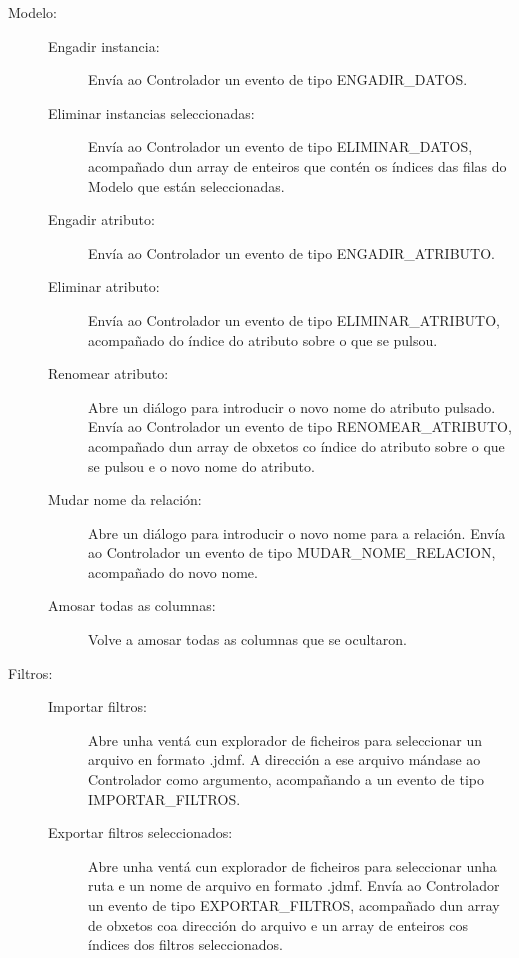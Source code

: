 \begin{description}
\item[Modelo:] \hfill

\begin{description}

\item[Engadir instancia:] \hfill
Envía ao Controlador un evento de tipo ENGADIR\_DATOS.

\item[Eliminar instancias seleccionadas:] \hfill
Envía ao Controlador un evento de tipo ELIMINAR\_DATOS, acompañado dun array de enteiros que contén os índices das filas do Modelo que están seleccionadas.

\item[Engadir atributo:] \hfill
Envía ao Controlador un evento de tipo ENGADIR\_ATRIBUTO.

\item[Eliminar atributo:] Envía ao Controlador un evento de tipo ELIMINAR\_ATRIBUTO, acompañado do índice do atributo sobre o que se pulsou.

\item[Renomear atributo:] \hfill
Abre un diálogo para introducir o novo nome do atributo pulsado. Envía ao Controlador un evento de tipo RENOMEAR\_ATRIBUTO, acompañado dun array de obxetos co índice do atributo sobre o que se pulsou e o novo nome do atributo.

\item[Mudar nome da relación:] \hfill
Abre un diálogo para introducir o novo nome para a relación. Envía ao Controlador un evento de tipo MUDAR\_NOME\_RELACION, acompañado do novo nome.

\item[Amosar todas as columnas:] \hfill
Volve a amosar todas as columnas que se ocultaron.

\end{description}

\item[Filtros:] \hfill

\begin{description}

\item[Importar filtros:] \hfill
Abre unha ventá cun explorador de ficheiros para seleccionar un arquivo en formato .jdmf. A dirección a ese arquivo mándase ao Controlador como argumento, acompañando a un evento de tipo IMPORTAR\_FILTROS.

\item[Exportar filtros seleccionados:] \hfill
Abre unha ventá cun explorador de ficheiros para seleccionar unha ruta e un nome de arquivo en formato .jdmf. Envía ao Controlador un evento de tipo EXPORTAR\_FILTROS, acompañado dun array de obxetos coa dirección do arquivo e un array de enteiros cos índices dos filtros seleccionados.


\end{description}
\end{description}
